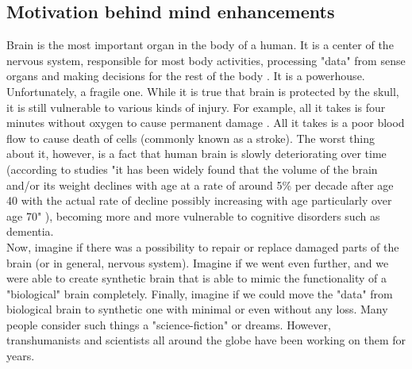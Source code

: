\documentclass[12pt]{article}
\begin{document}
\subsection{Motivation behind mind enhancements}
	Brain is the most important organ in the body of a human. It is a center of the nervous system, responsible for most body activities, processing "data" from sense organs and making decisions for the rest of the body \cite{humanBrainWiki}. It is a powerhouse. Unfortunately, a fragile one. While it is true that brain is protected by the skull, it is still vulnerable to various kinds of injury. For example, all it takes is four minutes without oxygen to cause permanent damage \cite{lackofoxygen}. All it takes is a poor blood flow to cause death of cells (commonly known as a stroke)\cite{wikipediaStroke}. The worst thing about it, however, is a fact that human brain is slowly deteriorating over time (according to studies "it has been widely found that the volume of the brain and/or its weight declines with age at a rate of around 5\% per decade after age 40 with the actual rate of decline possibly increasing with age particularly over age 70" \cite{brainAging}), becoming more and more vulnerable to cognitive disorders such as dementia.
	\\Now, imagine if there was a possibility to repair or replace damaged parts of the brain (or in general, nervous system). Imagine if we went even further, and we were able to create synthetic brain that is able to mimic the functionality of a "biological" brain completely. Finally, imagine if we could move the "data" from biological brain to synthetic one with minimal or even without any loss. Many people consider such things a "science-fiction" or dreams. However, transhumanists and scientists all around the globe have been working on them for years.
\end{document}
